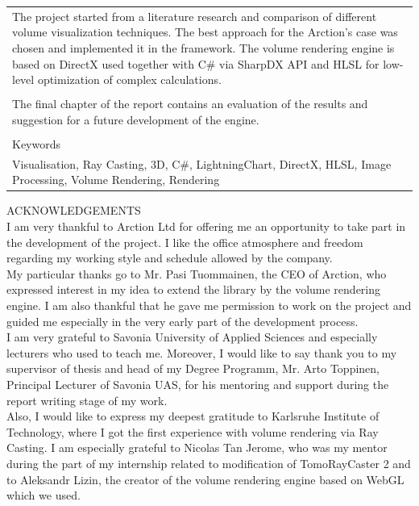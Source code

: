 \documentclass[twoside, english, 11pt]{report}
\begin{document}
\begin{table}[!h]
\begin{tabular}{| l | l | l | l |}
\multicolumn{4}{|p{14cm}|}{
The project started from a literature research and comparison of different volume visualization techniques. The best approach for the Arction's case was chosen and implemented it in the framework. The volume rendering engine is based on DirectX used together with C\# via SharpDX API and HLSL for low-level optimization of complex calculations.
}\\
\multicolumn{4}{|l|}{ }\\
\multicolumn{4}{|p{14cm}|}{
The final chapter of the report contains an evaluation of the results and suggestion for a future development of the engine.
}\\
\multicolumn{4}{|l|}{ }\\
\hline
\multicolumn{4}{|l|}{Keywords}\\
\multicolumn{4}{|p{14cm}|}{
Visualisation, Ray Casting, 3D, C\#, LightningChart, DirectX, HLSL, Image Processing, Volume Rendering, Rendering
}\\
\hline
\end{tabular}
\end{table}

\newpage

ACKNOWLEDGEMENTS\\

I am very thankful to Arction Ltd for offering me an opportunity to take part in the development of the project. I like the office atmosphere and freedom regarding my working style and schedule allowed by the company.\\

My particular thanks go to Mr. Pasi Tuommainen, the CEO of Arction, who expressed interest in my idea to extend the library by the volume rendering engine. I am also thankful that he gave me permission to work on the project and guided me especially in the very early part of the development process.\\

I am very grateful to Savonia University of Applied Sciences and especially lecturers who used to teach me.  Moreover, I would like to say thank you to my supervisor of thesis and head of my Degree Programm, Mr. Arto Toppinen, Principal Lecturer of Savonia UAS, for his mentoring and support during the report writing stage of my work. \\

Also, I would like to express my deepest gratitude to Karlsruhe Institute of Technology, where I got the first experience with volume rendering via Ray Casting. I am especially grateful to Nicolas Tan Jerome, who was my mentor during the part of my internship related to modification of TomoRayCaster 2 and to Aleksandr Lizin, the creator of the volume rendering engine based on WebGL which we used.
\end{document}
